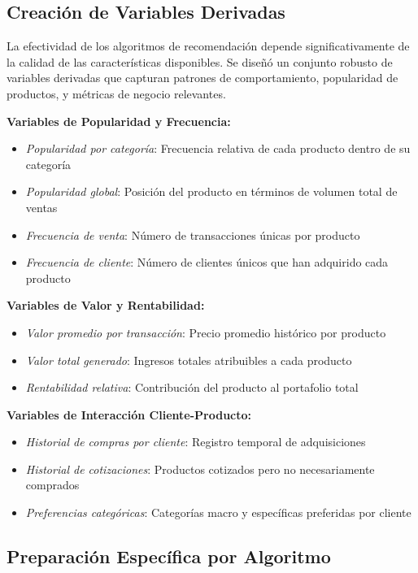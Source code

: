 \documentclass[twocolumn]{article}
\begin{document}
\subsection{Creación de Variables Derivadas}

La efectividad de los algoritmos de recomendación depende significativamente de la calidad de las características disponibles. Se diseñó un conjunto robusto de variables derivadas que capturan patrones de comportamiento, popularidad de productos, y métricas de negocio relevantes.

\textbf{Variables de Popularidad y Frecuencia:}
\begin{itemize}
    \item \textit{Popularidad por categoría}: Frecuencia relativa de cada producto dentro de su categoría
    \item \textit{Popularidad global}: Posición del producto en términos de volumen total de ventas
    \item \textit{Frecuencia de venta}: Número de transacciones únicas por producto
    \item \textit{Frecuencia de cliente}: Número de clientes únicos que han adquirido cada producto
\end{itemize}

\textbf{Variables de Valor y Rentabilidad:}
\begin{itemize}
    \item \textit{Valor promedio por transacción}: Precio promedio histórico por producto
    \item \textit{Valor total generado}: Ingresos totales atribuibles a cada producto
    \item \textit{Rentabilidad relativa}: Contribución del producto al portafolio total
\end{itemize}

\textbf{Variables de Interacción Cliente-Producto:}
\begin{itemize}
    \item \textit{Historial de compras por cliente}: Registro temporal de adquisiciones
    \item \textit{Historial de cotizaciones}: Productos cotizados pero no necesariamente comprados
    \item \textit{Preferencias categóricas}: Categorías macro y específicas preferidas por cliente
\end{itemize}

\subsection{Preparación Específica por Algoritmo}
\end{document}
